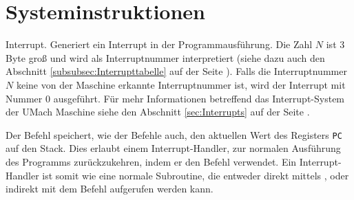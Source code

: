 \section{Systeminstruktionen}

\glqq Interrupt\grqq.
Generiert ein Interrupt in der Programmausführung. Die Zahl $N$
ist 3 Byte groß und wird als Interruptnummer interpretiert (siehe dazu auch den
Abschnitt \ref{subsubsec:Interrupttabelle} auf der Seite
\pageref{subsubsec:Interrupttabelle}). Falls die Interruptnummer $N$ keine von
der Maschine erkannte Interruptnummer ist, wird der Interrupt mit Nummer 0
ausgeführt. Für mehr Informationen betreffend das Interrupt-System der UMach
Maschine siehe den Abschnitt \ref{sec:Interrupts} auf der Seite
\pageref{sec:Interrupts}.

Der Befehl  speichert, wie der Befehle  auch, den
aktuellen Wert des Registers \texttt{PC} auf den Stack. Dies erlaubt einem
Interrupt-Handler, zur normalen Ausführung des Programms zurückzukehren, indem
er den Befehl  verwendet. Ein Interrupt-Handler ist somit wie
eine normale Subroutine, die entweder direkt mittels , oder indirekt
mit dem Befehl  aufgerufen werden kann.
